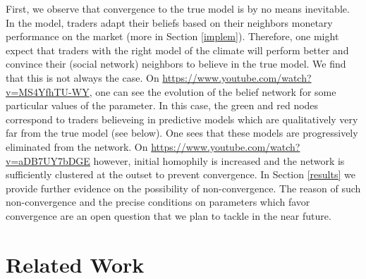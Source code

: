\documentclass{sig-alternate}
\begin{document}
First, we observe that convergence to the true model is by no means inevitable. In the model, traders adapt their beliefs based on their neighbors monetary performance on the market (more in Section \ref{implem}). Therefore, one might expect that traders with the right model of the climate will perform better and  convince their (social network) neighbors to believe in the true model. We find that this is not always the case. On \url{https://www.youtube.com/watch?v=MS4YfhTU-WY}, one can see the evolution of the belief network for some particular values of the parameter. In this case, the green and red nodes correspond to traders believeing in predictive models which are qualitatively very far from the true model (see below). One sees that these models are progressively eliminated from the network. On \url{https://www.youtube.com/watch?v=aDB7UY7bDGE} however, initial homophily is increased and the network is sufficiently clustered at the outset to prevent convergence. In Section \ref{results} we provide further evidence on the possibility of non-convergence.  The reason of such non-convergence and the precise conditions on parameters which favor convergence are an open question that we plan to tackle in the near future. 


% 

  \section{Related Work}
	\label{related}
	
\end{document}
